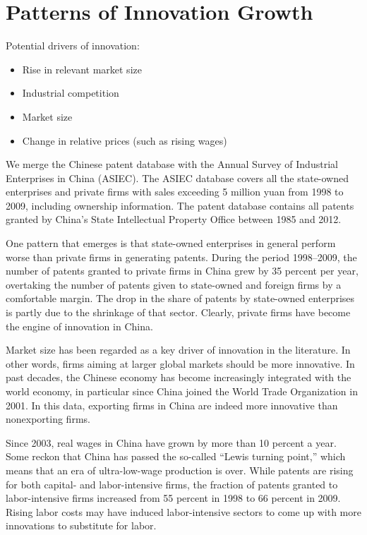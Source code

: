 \documentclass{article}
\begin{document}
    \section*{Patterns of Innovation Growth}
    Potential drivers of innovation:
    \begin{itemize}
        \item Rise in relevant market size
        \item Industrial competition
        \item Market size
        \item Change in relative prices (such as rising wages)
    \end{itemize}

    We merge the Chinese patent database with the Annual Survey of Industrial Enterprises in China (ASIEC). The ASIEC database covers all the state-owned enterprises and private firms with sales exceeding 5 million yuan from 1998 to 2009, including ownership information. The patent database contains all patents granted by China’s State Intellectual Property Office between 1985 and 2012.

    One pattern that emerges is that state-owned enterprises in general perform worse than private firms in generating patents. During the period 1998–2009, the number of patents granted to private firms in China grew by 35 percent per year, overtaking the number of patents given to state-owned and foreign firms by a comfortable margin. The drop in the share of patents by state-owned enterprises is partly due to the shrinkage of that sector. Clearly, private firms have become the engine of innovation in China.

    Market size has been regarded as a key driver of innovation in the literature. In other words, firms aiming at larger global markets should be more innovative. In past decades, the Chinese economy has become increasingly integrated with the world economy, in particular since China joined the World Trade Organization in 2001. In this data, exporting firms in China are indeed more innovative than nonexporting firms.

    Since 2003, real wages in China have grown by more than 10 percent a year. Some reckon that China has passed the so-called “Lewis turning point,” which means that an era of ultra-low-wage production is over. While patents are rising for both capital- and labor-intensive firms, the fraction of patents granted to labor-intensive firms increased from 55 percent in 1998 to 66 percent in 2009. Rising labor costs may have induced labor-intensive sectors to come up with more innovations to substitute for labor.
\end{document}
